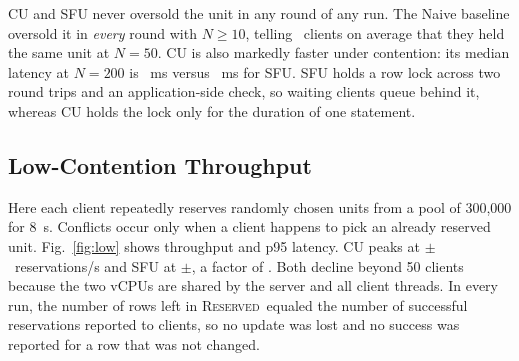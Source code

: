 \documentclass[conference]{IEEEtran}
\newcommand{\Rs}{\textsc{Reserved}}
\begin{document}
CU and SFU never oversold the unit in any round of any run. The Naive
baseline oversold it in \emph{every} round with $N\ge10$, telling
\NaiveAvgFifty\ clients on average that they held the same unit at
$N=50$. CU is also markedly faster under contention: its median
latency at $N=200$ is \HotCUpFiftyTwoH~ms versus \HotSFUpFiftyTwoH~ms
for SFU. SFU holds a row lock across two round trips and an
application-side check, so waiting clients queue behind it, whereas CU
holds the lock only for the duration of one statement.

\subsection{Low-Contention Throughput}

Here each client repeatedly reserves randomly chosen units from a pool
of 300{,}000 for 8~s. Conflicts occur only when a client happens to
pick an already reserved unit. Fig.~\ref{fig:low} shows throughput and
p95 latency. CU peaks at \LowCUpeak$\pm$\LowCUpeakSD\ reservations/s
and SFU at \LowSFUpeak$\pm$\LowSFUpeakSD, a factor of \LowCUpeakX. Both decline beyond 50 clients
because the two vCPUs are shared by the server and all client threads.
In every run, the number of rows left in \Rs\ equaled the number of
successful reservations reported to clients, so no update was lost
and no success was reported for a row that was not changed.
\end{document}
